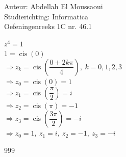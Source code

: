 \documentclass[a4paper]{article}
\begin{document}
  
\noindent \large Auteur: Abdellah El Moussaoui \\
\noindent \large Studierichting: Informatica\\
\noindent \large Oefeningenreeks 1C nr. 46.1\\

\medskip

\normalsize

\medskip

$z^4=1$\\

$1=\operatorname{cis}(0)$\\

$\Rightarrow z_k=\operatorname{cis}\left(\dfrac{0+2k\pi}{4}\right),\ k=0,1,2,3$\\

$\Rightarrow z_0=\operatorname{cis}(0)=1$\\

$\Rightarrow z_1=\operatorname{cis}\left(\dfrac{\pi}{2}\right)=i$\\

$\Rightarrow z_2=\operatorname{cis}(\pi)=-1$\\

$\Rightarrow z_3=\operatorname{cis}\left(\dfrac{3\pi}{2}\right)=-i$\\

$\Rightarrow \boxed{z_0=1,\ z_1=i,\ z_2=-1,\ z_3=-i}$\\

\begin{thebibliography}{999}
\end{thebibliography}
\end{document}
